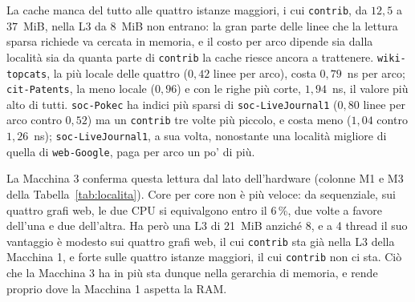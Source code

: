 \documentclass[11pt,a4paper]{article}
\newcommand{\stacco}{\par\medskip\noindent}
\begin{document}
\stacco
La cache manca del tutto alle quattro istanze maggiori, i cui
\texttt{contrib}, da $12{,}5$ a $37$~MiB, nella L3 da 8~MiB non entrano: la
gran parte delle linee che la lettura sparsa richiede va cercata in memoria, e il
costo per arco dipende sia dalla località sia da quanta parte di
\texttt{contrib} la cache riesce ancora a trattenere.
\texttt{wiki-topcats}, la più locale delle quattro ($0{,}42$ linee per arco),
costa $0{,}79$~ns per arco; \texttt{cit-Patents}, la meno locale ($0{,}96$) e
con le righe più corte, $1{,}94$~ns, il valore più alto di tutti.
\texttt{soc-Pokec} ha indici più sparsi di \texttt{soc-LiveJournal1} ($0{,}80$
linee per arco contro $0{,}52$) ma un \texttt{contrib} tre volte più piccolo,
e costa meno ($1{,}04$ contro $1{,}26$~ns); \texttt{soc-LiveJournal1}, a sua
volta, nonostante una località migliore di quella di \texttt{web-Google}, paga
per arco un po' di più.


\stacco
La Macchina 3 conferma questa lettura dal lato dell'hardware (colonne
M1 e M3 della Tabella~\ref{tab:localita}). Core per core non è più veloce: da
sequenziale, sui quattro grafi web, le due CPU si equivalgono entro il
6\,\%, due volte a favore dell'una e due dell'altra. Ha però una L3 di 21~MiB anziché 8, e a 4 thread il suo vantaggio è
modesto sui quattro grafi web, il cui \texttt{contrib} sta già nella L3 della
Macchina 1, e forte sulle quattro
istanze maggiori, il cui \texttt{contrib} non ci sta.
Ciò che la Macchina 3 ha in più sta dunque nella gerarchia di memoria,
e rende proprio dove la Macchina 1 aspetta la RAM.
\end{document}
